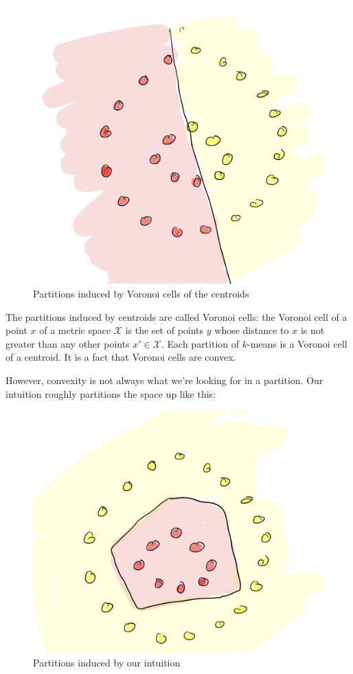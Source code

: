 \begin{figure}
\begin{center}
\includegraphics[width=.7\linewidth]{chapter_2/files/voronoi-cell.jpg}
\end{center}
\caption{Partitions induced by Voronoi cells of the centroids}
\end{figure}

The partitions induced by centroids are called Voronoi cells: the Voronoi
cell of a point $x$ of a metric space $\mathcal{X}$ is the set of points
$y$ whose distance to $x$ is not greater than any other points $x' \in \mathcal{X}$.
Each partition of $k$-means is a Voronoi cell of a centroid. It is a fact that
Voronoi cells are convex.

However, convexity is not always what we're looking for in a partition. Our intuition
roughly partitions the space up like this:

\begin{figure}
\begin{center}
\includegraphics[width=.7\linewidth]{chapter_2/files/intuition-cell.jpg}
\end{center}
\caption{Partitions induced by our intuition}
\end{figure}

